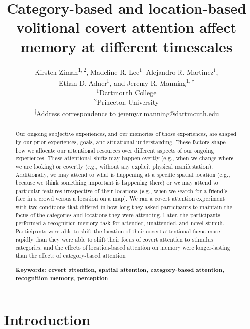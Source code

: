 \documentclass[english]{article}
\begin{document}
\title{Category-based and location-based volitional covert attention affect
memory at different timescales}

\author{Kirsten Ziman\textsuperscript{$1, 2$},
Madeline R. Lee$^1$,
Alejandro R. Martinez$^1$,\\
Ethan D. Adner$^1$,
and
Jeremy R. Manning\textsuperscript{$1, \dagger$}\\[0.1in]$^1$Dartmouth College\\
$^2$Princeton University\\
\textsuperscript{$\dagger$}Address correspondence to jeremy.r.manning@dartmouth.edu}

\maketitle

\begin{abstract} 
  
Our ongoing subjective experiences, and our memories of those experiences, are
shaped by our prior experiences, goals, and situational understanding. These
factors shape how we allocate our attentional resources over different aspects
of our ongoing experiences. These attentional shifts may happen overtly (e.g.,
when we change where we are looking) or covertly (e.g., without any explicit
physical manifestation). Additionally, we may attend to what is happening at a
specific spatial location (e.g., because we think something important is
happening there) or we may attend to particular features irrespective of their
locations (e.g., when we search for a friend's face in a crowd versus a
location on a map). We ran a covert attention experiment with two conditions
that differed in how long they asked participants to maintain the focus of the
categories and locations they were attending. Later, the participants performed
a recognition memory task for attended, unattended, and novel stimuli.
Participants were able to shift the location of their covert attentional focus
more rapidly than they were able to shift their focus of covert attention to
stimulus categories, and the effects of location-based attention on memory were
longer-lasting than the effects of category-based attention.

\noindent\textbf{Keywords: covert attention, spatial attention, category-based
attention, recognition memory, perception}

\end{abstract}


\section*{Introduction} 
\end{document}
